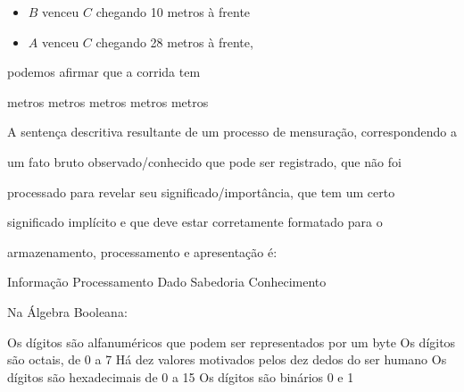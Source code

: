 \documentclass[12pt, addpoints]{exam}
\begin{document}
\begin{questions}
\begin{itemize}
    \item \( B \) venceu \( C \) chegando 10 metros à frente

    \item \( A \) venceu \( C \) chegando 28 metros à frente,

\end{itemize}



podemos afirmar que a corrida tem
\begin{choices}
 metros
 metros
 metros
 metros
 metros
\end{choices}

\question

A sentença descritiva resultante de um processo de mensuração, correspondendo a

um fato bruto observado/conhecido que pode ser registrado, que não foi

processado para revelar seu significado/importância, que tem um certo

significado implícito e que deve estar corretamente formatado para o

armazenamento, processamento e apresentação é:
\begin{choices}
\choice Informação
\choice Processamento
\choice Dado
\choice Sabedoria
\choice Conhecimento
\end{choices}

\question

Na Álgebra Booleana:
\begin{choices}
\choice Os dígitos são alfanuméricos que podem ser representados por um byte
\choice Os dígitos são octais, de 0 a 7
\choice Há dez valores motivados pelos dez dedos do ser humano
\choice Os dígitos são hexadecimais de 0 a 15
\choice Os dígitos são binários 0 e 1
\end{choices}



    \end{questions}
    
\end{document}
